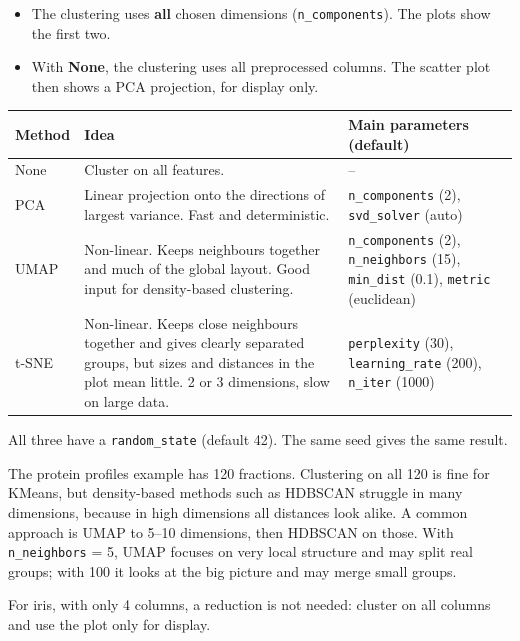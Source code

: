 \documentclass[11pt,a4paper]{article}
\newcommand{\param}[1]{\texttt{#1}}         %
\begin{document}
\begin{itemize}
  \item The clustering uses \textbf{all} chosen dimensions (\param{n\_components}). The plots show the first two.
  \item With \textbf{None}, the clustering uses all preprocessed columns. The scatter plot then shows a PCA
    projection, for display only.
\end{itemize}

\begin{center}
\begin{tabularx}{\textwidth}{lLL}
\toprule
Method & Idea & Main parameters (default)\\
\midrule
None & Cluster on all features. & --\\
PCA & Linear projection onto the directions of largest variance. Fast and deterministic. &
  \param{n\_components} (2), \param{svd\_solver} (auto)\\
UMAP & Non-linear. Keeps neighbours together and much of the global layout. Good input for density-based
  clustering. & \param{n\_components} (2), \param{n\_neighbors} (15), \param{min\_dist} (0.1), \param{metric}
  (euclidean)\\
t-SNE & Non-linear. Keeps close neighbours together and gives clearly separated groups, but sizes and distances in
  the plot mean little. 2 or 3 dimensions, slow on large data. & \param{perplexity} (30), \param{learning\_rate}
  (200), \param{n\_iter} (1000)\\
\bottomrule
\end{tabularx}
\end{center}

All three have a \param{random\_state} (default 42). The same seed gives the same result.

\begin{example}
The protein profiles example has 120 fractions. Clustering on all 120 is fine for KMeans, but density-based methods
such as HDBSCAN struggle in many dimensions, because in high dimensions all distances look alike. A common approach
is UMAP to 5--10 dimensions, then HDBSCAN on those. With \param{n\_neighbors} = 5, UMAP focuses on very local
structure and may split real groups; with 100 it looks at the big picture and may merge small groups.

For iris, with only 4 columns, a reduction is not needed: cluster on all columns and use the plot only for display.
\end{example}
\end{document}
